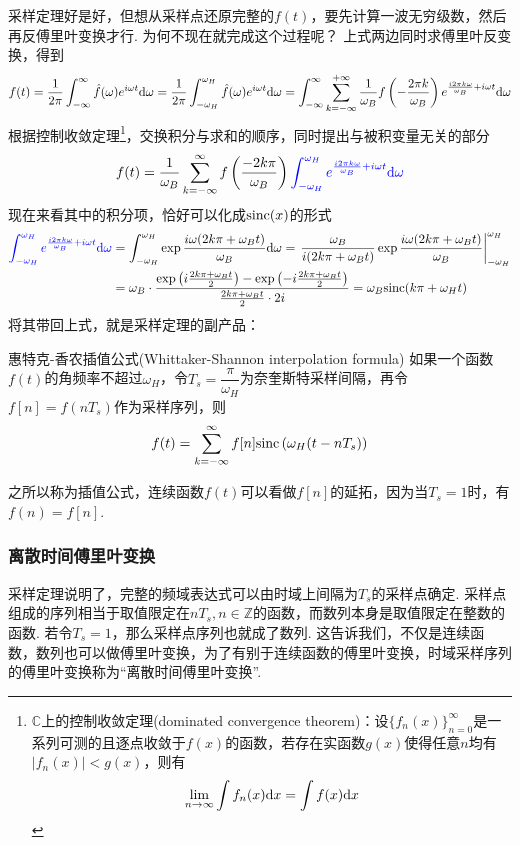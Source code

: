 采样定理好是好，但想从采样点还原完整的\(f(t)\)，要先计算一波无穷级数，然后再反傅里叶变换才行. 为何不现在就完成这个过程呢？
上式两边同时求傅里叶反变换，得到
\[f(t) = \frac{1}{2\pi}\int_{-\infty}^{\infty}\hat{f}(\omega)e^{i\omega t}{\rm d}\omega 
= \frac{1}{2\pi}\int_{-\omega_H}^{\omega_H}\hat{f}(\omega)e^{i\omega t}{\rm d}\omega 
= \int_{-\infty}^{\infty}\sum_{k=-\infty}^{+\infty} \frac{1}{\omega_B}f\left(-\frac{2\pi k}{\omega_B}\right)e^{\frac{i2\pi k\omega}{\omega_B} + i\omega t}{\rm d}\omega\]
根据控制收敛定理\footnote{\(\mathbb{C}\)上的控制收敛定理(dominated convergence theorem)：设\(\{f_n(x)\}_{n=0}^{\infty}\)是一系列可测的且逐点收敛于\(f(x)\)的函数，若存在实函数\(g(x)\)使得任意\(n\)均有\(|f_n(x)|<g(x)\)，则有\[\lim_{n \to \infty}\int f_n(x){\rm d}x = \int f(x){\rm d}x\]}，交换积分与求和的顺序，同时提出与被积变量无关的部分
\[f(t) = \frac{1}{\omega_B}\sum_{k=-\infty}^{\infty}f\left(\frac{-2k\pi}{\omega_B}\right){\color{blue}\int_{-\omega_H}^{\omega_H}e^{\frac{i2\pi k\omega}{\omega_B} + i\omega t}{\rm d}\omega}\]
现在来看其中的积分项，恰好可以化成\({\rm sinc}(x)\)的形式
\begin{align*}
    {\color{blue}\int_{-\omega_H}^{\omega_H}e^{\frac{i2\pi k\omega}{\omega_B} + i\omega t}{\rm d}\omega} 
    &= \int_{-\omega_H}^{\omega_H}\exp{\frac{i\omega(2k\pi+\omega_Bt)}{\omega_B}}{\rm d}\omega
    = \left.\frac{\omega_B}{i(2k\pi+\omega_Bt)}\exp{\frac{i\omega(2k\pi+\omega_Bt)}{\omega_B}}\right|_{-\omega_H}^{\omega_H} \\
    &= \omega_B\cdot\frac{\exp\left(i\frac{2k\pi+\omega_Bt}{2}\right) - \exp\left(-i\frac{2k\pi+\omega_Bt}{2}\right)}{\frac{2k\pi+\omega_Bt}{2}\cdot 2i} = \omega_B{\rm sinc}(k\pi+\omega_Ht)
\end{align*}
将其带回上式，就是采样定理的副产品：
\begin{theorem}{惠特克-香农插值公式(Whittaker-Shannon interpolation formula)}
    如果一个函数\(f(t)\)的角频率不超过\(\omega_H\)，令\(T_s=\dfrac{\pi}{\omega_H}\)为奈奎斯特采样间隔，再令\(f[n]=f(nT_s)\)作为采样序列，则
    \[f(t) = \sum_{k=-\infty}^{\infty}f[n]{\rm sinc}\left(\omega_H(t-nT_s)\right)\]
\end{theorem}
之所以称为插值公式，连续函数\(f(t)\)可以看做\(f[n]\)的延拓，因为当\(T_s=1\)时，有\(f(n)=f[n]\).

\subsubsection{离散时间傅里叶变换}

采样定理说明了，完整的频域表达式可以由时域上间隔为\(T_s\)的采样点确定. 采样点组成的序列相当于取值限定在\(nT_s, n\in \mathbb{Z}\)的函数，而数列本身是取值限定在整数的函数. 若令\(T_s=1\)，那么采样点序列也就成了数列. 这告诉我们，不仅是连续函数，数列也可以做傅里叶变换，为了有别于连续函数的傅里叶变换，时域采样序列的傅里叶变换称为“离散时间傅里叶变换”.

